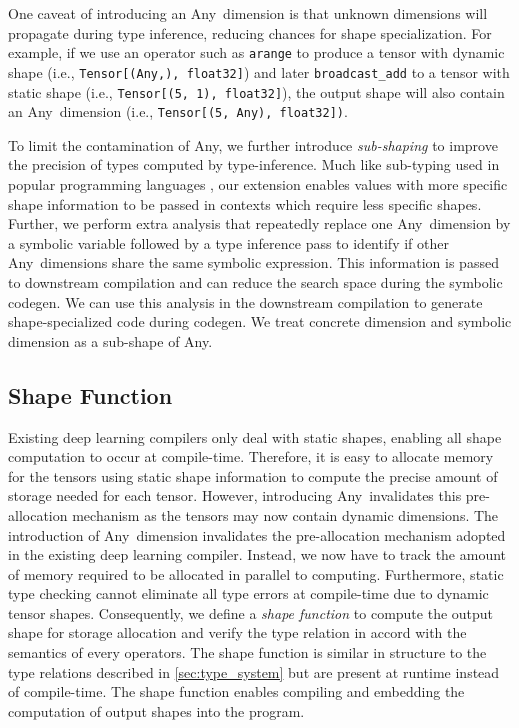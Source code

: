One caveat of introducing an Any~dimension is that unknown dimensions will
  propagate during type inference, reducing chances for shape specialization.
For example, if we use an operator such as {\tt arange} to produce a
  tensor with dynamic shape (i.e., \texttt{Tensor[(Any,), float32]})
  and later {\tt broadcast\_add} to a tensor with static shape (i.e., \texttt{Tensor[(5, 1), float32]}),
  the output shape will also contain an Any~dimension (i.e., \texttt{Tensor[(5, Any), float32])}.

To limit the contamination of Any, we further introduce {\em sub-shaping}
  to improve the precision of types computed by type-inference.
Much like sub-typing used in popular programming languages \citep{LiskovTPLS1994,AmadioAmadioTPLS1993},
  our extension enables values with more specific shape information to be passed in contexts which require less specific shapes.
Further, we perform extra analysis that repeatedly replace one Any~dimension by a symbolic variable followed by
  a type inference pass to identify if other Any~dimensions share the same symbolic expression.
This information is passed to downstream compilation
  and can reduce the search space during the symbolic codegen.
We can use this analysis in the downstream compilation
  to generate shape-specialized code during codegen.
We treat concrete dimension and symbolic dimension as a sub-shape of Any.

\subsection{Shape Function}
\label{sec:type_systemTech:shape-func}
Existing deep learning compilers only deal with static shapes,
  enabling all shape computation to occur at compile-time.
Therefore, it is easy to allocate memory for the tensors
  using static shape information to compute the precise amount of storage needed for each tensor.
However, introducing Any~invalidates this pre-allocation
  mechanism as the tensors may now contain dynamic dimensions.
The introduction of Any~dimension invalidates the pre-allocation
  mechanism adopted in the existing deep learning compiler.
Instead, we now have to track the amount of memory required to be allocated in parallel to computing.
Furthermore, static type checking cannot eliminate all
  type errors at compile-time due to dynamic tensor shapes.
Consequently, we define a {\em shape function} to compute the output shape
  for storage allocation and verify the type relation in accord with the semantics of every operators.
The shape function is similar in structure to the type relations described in
  \ref{sec:type_system} but are present at runtime instead of compile-time.
The shape function enables compiling and embedding the computation of output
  shapes into the program.

